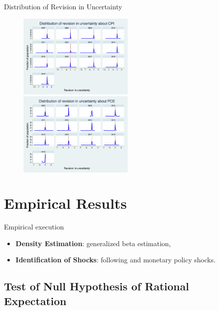 \documentclass{beamer}
\begin{document}
\begin{frame}{Distribution of Revision in Uncertainty}
\begin{figure}
	\includegraphics[width=0.5\textwidth]{figuresDraft/PRCCPIVar01_rv_true_hist.png}  
\includegraphics[width=0.5\textwidth]{figuresDraft/PRCPCEVar01_rv_true_hist.png} 
\end{figure}
\end{frame}



\section{Empirical Results}

\begin{frame}{Empirical execution}

\begin{itemize}

\item \textbf{Density Estimation}: generalized beta estimation, \cite{engelberg2009comparing}
 \item \textbf{Identification of Shocks}: following \cite{coibion2012can} and monetary policy shocks. 
\end{itemize}

\end{frame}

\subsection{Test of Null Hypothesis of Rational Expectation}
\end{document}
